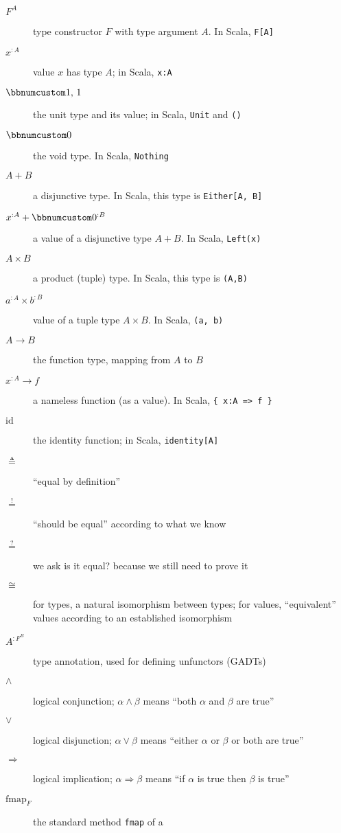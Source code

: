 \begin{description}
\item [{$F^{A}$}] type constructor $F$ with type argument $A$. In Scala,
\lstinline!F[A]!
\item [{$x^{:A}$}] value $x$ has type $A$; in Scala, \lstinline!x:A!
\item [{$\bbnum 1,\,1$}] the unit type and its value; in Scala, \lstinline!Unit!
and \lstinline!()!
\item [{$\bbnum 0$}] the void type. In Scala, \lstinline!Nothing!
\item [{$A+B$}] a disjunctive type. In Scala, this type is \lstinline!Either[A, B]! 
\item [{$x^{:A}+\bbnum 0^{:B}$}] a value of a disjunctive type $A+B$.
In Scala, \lstinline!Left(x)!
\item [{$A\times B$}] a product (tuple) type. In Scala, this type is \lstinline!(A,B)!
\item [{$a^{:A}\times b^{:B}$}] value of a tuple type $A\times B$. In
Scala, \lstinline!(a, b)!
\item [{$A\rightarrow B$}] the function type, mapping from $A$ to $B$
\item [{$x^{:A}\rightarrow f$}] a nameless function (as a value). In Scala,
\lstinline!{ x:A => f }!
\item [{$\text{id}$}] the identity function; in Scala, \lstinline!identity[A]!
\item [{$\triangleq$}] ``equal by definition''
\item [{$\overset{!}{=}$}] ``should be equal'' according to what we
know
\item [{$\overset{?}{=}$}] we ask \textemdash{} is it equal? \textemdash{}
because we still need to prove it
\item [{$\cong$}] for types, a natural isomorphism between types; for
values, ``equivalent'' values according to an established isomorphism
\item [{$A^{:F^{B}}$}] type annotation, used for defining unfunctors (GADTs)
\item [{$\wedge$}] logical conjunction; $\alpha\wedge\beta$ means ``both
$\alpha$ and $\beta$ are true''
\item [{$\vee$}] logical disjunction; $\alpha\vee\beta$ means ``either
$\alpha$ or $\beta$ or both are true''
\item [{$\Rightarrow$}] logical implication; $\alpha\Rightarrow\beta$
means ``if $\alpha$ is true then $\beta$ is true''
\item [{$\text{fmap}_{F}$}] the standard method \lstinline!fmap! of a

\end{description}
